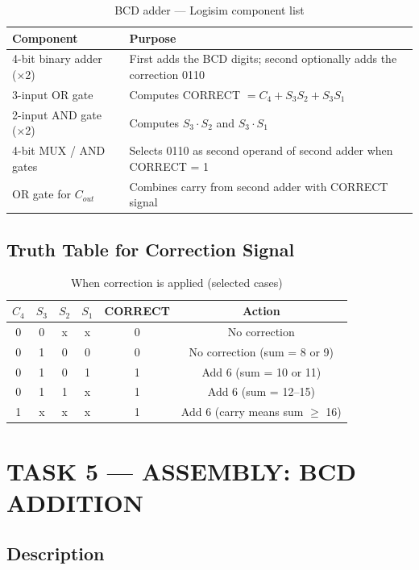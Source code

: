 \documentclass[12pt,a4paper]{article}
\begin{document}
\begin{table}[H]
\centering
\caption{BCD adder --- Logisim component list}
\begin{tabular}{|l|p{9cm}|}
\hline
\textbf{Component} & \textbf{Purpose} \\
\hline
4-bit binary adder (×2) & First adds the BCD digits; second optionally adds the correction 0110 \\
\hline
3-input OR gate & Computes CORRECT $= C_4 + S_3 S_2 + S_3 S_1$ \\
\hline
2-input AND gate (×2) & Computes $S_3 \cdot S_2$ and $S_3 \cdot S_1$ \\
\hline
4-bit MUX / AND gates & Selects 0110 as second operand of second adder when CORRECT = 1 \\
\hline
OR gate for $C_{out}$ & Combines carry from second adder with CORRECT signal \\
\hline
\end{tabular}
\end{table}

\subsection{Truth Table for Correction Signal}

\begin{table}[H]
\centering
\caption{When correction is applied (selected cases)}
\small
\begin{tabular}{|c|c|c|c|c|c|}
\hline
$C_4$ & $S_3$ & $S_2$ & $S_1$ & CORRECT & Action \\
\hline
0 & 0 & x & x & 0 & No correction \\
\hline
0 & 1 & 0 & 0 & 0 & No correction (sum = 8 or 9) \\
\hline
0 & 1 & 0 & 1 & 1 & Add 6 (sum = 10 or 11) \\
\hline
0 & 1 & 1 & x & 1 & Add 6 (sum = 12--15) \\
\hline
1 & x & x & x & 1 & Add 6 (carry means sum $\geq$ 16) \\
\hline
\end{tabular}
\end{table}

\newpage
\section{TASK 5 --- ASSEMBLY: BCD ADDITION}

\subsection{Description}
\end{document}
